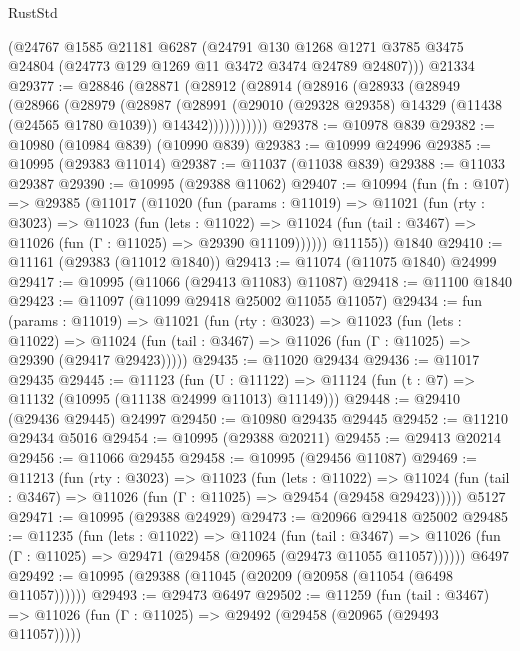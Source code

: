 \begin{lexlean}{RustStd}
\begin{coremodule}
    (@24767
      @1585
      @21181
      @6287
      (@24791
        @130
        @1268
        @1271
        @3785
        @3475
        @24804
        (@24773 @129 @1269 @11 @3472 @3474 @24789 @24807)))
    @21334
@29377 := @28846
    (@28871
      (@28912
        (@28914
          (@28916
            (@28933
              (@28949
                (@28966
                  (@28979
                    (@28987
                      (@28991
                        (@29010
                          (@29328 @29358)
                          @14329
                          (@11438 (@24565 @1780 @1039))
                          @14342)))))))))))
@29378 := @10978 @839
@29382 := @10980 (@10984 @839) (@10990 @839)
@29383 := @10999 @24996
@29385 := @10995 (@29383 @11014)
@29387 := @11037 (@11038 @839)
@29388 := @11033 @29387
@29390 := @10995 (@29388 @11062)
@29407 := @10994
    (fun (fn : @107) =>
    @29385
      (@11017
        (@11020
          (fun (params : @11019) =>
          @11021
            (fun (rty : @3023) =>
            @11023
              (fun (lets : @11022) =>
              @11024 (fun (tail : @3467) => @11026 (fun (Γ : @11025) => @29390 @11109))))))
        @11155))
    @1840
@29410 := @11161 (@29383 (@11012 @1840))
@29413 := @11074 (@11075 @1840) @24999
@29417 := @10995 (@11066 (@29413 @11083) @11087)
@29418 := @11100 @1840
@29423 := @11097 (@11099 @29418 @25002 @11055 @11057)
@29434 := fun (params : @11019) =>
  @11021
    (fun (rty : @3023) =>
    @11023
      (fun (lets : @11022) =>
      @11024 (fun (tail : @3467) => @11026 (fun (Γ : @11025) => @29390 (@29417 @29423)))))
@29435 := @11020 @29434
@29436 := @11017 @29435
@29445 := @11123
    (fun (U : @11122) => @11124 (fun (t : @7) => @11132 (@10995 (@11138 @24999 @11013) @11149)))
@29448 := @29410 (@29436 @29445) @24997
@29450 := @10980 @29435 @29445
@29452 := @11210 @29434 @5016
@29454 := @10995 (@29388 @20211)
@29455 := @29413 @20214
@29456 := @11066 @29455
@29458 := @10995 (@29456 @11087)
@29469 := @11213
    (fun (rty : @3023) =>
    @11023
      (fun (lets : @11022) =>
      @11024 (fun (tail : @3467) => @11026 (fun (Γ : @11025) => @29454 (@29458 @29423)))))
    @5127
@29471 := @10995 (@29388 @24929)
@29473 := @20966 @29418 @25002
@29485 := @11235
    (fun (lets : @11022) =>
    @11024
      (fun (tail : @3467) =>
      @11026 (fun (Γ : @11025) => @29471 (@29458 (@20965 (@29473 @11055 @11057))))))
    @6497
@29492 := @10995 (@29388 (@11045 (@20209 (@20958 (@11054 (@6498 @11057))))))
@29493 := @29473 @6497
@29502 := @11259
    (fun (tail : @3467) => @11026 (fun (Γ : @11025) => @29492 (@29458 (@20965 (@29493 @11057)))))

\end{coremodule}
\end{lexlean}
